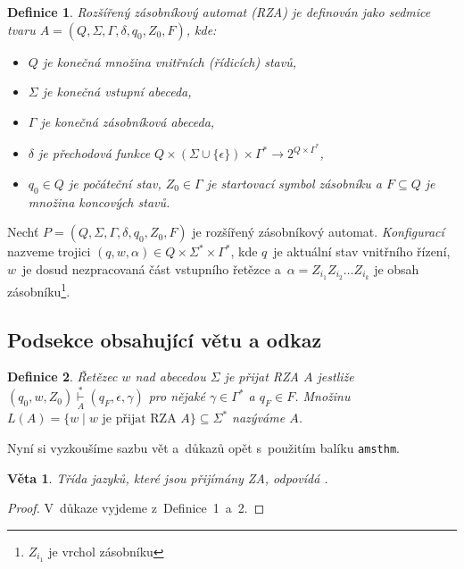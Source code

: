 \documentclass[a4paper, 11pt, twocolumn]{article}
\newtheorem{definition}{Definice}
\newtheorem{sentence}{Věta}
\begin{document}
\begin{definition}
{\normalfont Rozšířený zásobníkový automat} (RZA) je definován jako sedmice tvaru $A=(Q, \Sigma, \Gamma, \delta, q_0, Z_0, F)$, kde:
\renewcommand\labelitemi{$\bullet$}
\begin{itemize}
\item $Q$ je konečná množina {\normalfont vnitřních (řídicích) stavů},

\item $\Sigma$ je konečná {\normalfont vstupní abeceda},

\item $\Gamma$ je konečná {\normalfont zásobníková abeceda},

\item $\delta$ je {\normalfont přechodová funkce} $Q \times (\Sigma\cup\{\epsilon\})\times\Gamma^\ast\rightarrow2^{Q\times\Gamma^\ast}$,

\item $q_0\in Q$ je {\normalfont počáteční stav}, $Z_0\in\Gamma$ je {\normalfont startovací symbol
zásobníku} a $F \subseteq Q$ je množina {\normalfont koncových stavů}.
\end{itemize}
\end{definition}

Nechť $P=(Q,\Sigma,\Gamma,\delta,q_0,Z_0,F)$ je rozšířený zásobníkový automat. \textit{Konfigurací} nazveme trojici $(q,w,\alpha) \in Q\times\Sigma^\ast\times\Gamma^\ast$, kde $q$~je aktuální stav vnitřního řízení, $w$~je dosud nezpracovaná část vstupního řetězce a~$\alpha=Z_{i_1}Z_{i_2}\dots Z_{i_k}$ je obsah zásobníku\footnote{$Z_{i_1}$
je vrchol zásobníku}.

\subsection{Podsekce obsahující větu a odkaz}
\begin{definition}
{\normalfont Řetězec $w$ nad abecedou $\Sigma$ je přijat RZA} $A$ jestliže $(q_0,w,Z_0) \overset{*}{\underset{A}\vdash} (q_F,\epsilon,\gamma)$ pro nějaké $\gamma\in\Gamma^\ast$ a $q_F\in F$. Množinu $L(A)=\{w\;|\;w\text{ je přijat RZA }A\} \subseteq\Sigma^\ast$ nazýváme  $A$.
\end{definition}

\newpage
Nyní si vyzkoušíme sazbu vět a~důkazů opět s~použitím balíku \texttt{amsthm}.

\begin{sentence}
Třída jazyků, které jsou přijímány ZA, odpovídá .
\end{sentence}
\begin{proof}
V~důkaze vyjdeme z~Definice~1~a~2.
\end{proof}
\end{document}
